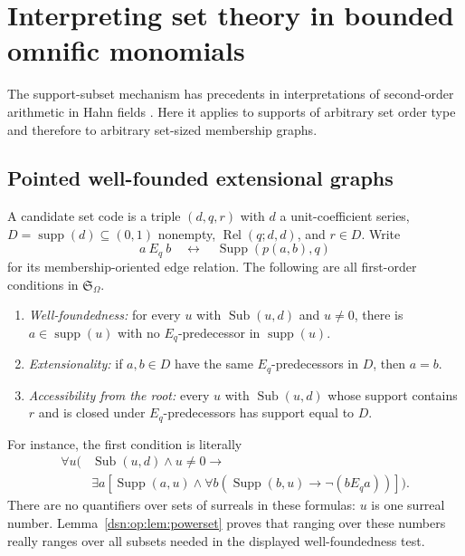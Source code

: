 \documentclass[11pt,a4paper]{article}
\numberwithin{equation}{section}
\theoremstyle{definition}
\theoremstyle{remark}
\newcommand{\Somega}{\mathfrak S_\Omega}
\begin{document}
\section{Interpreting set theory in bounded omnific monomials}
\label{dsn:op:sec:set-interpretation}

The support-subset mechanism has precedents in interpretations of
second-order arithmetic in Hahn fields \cite{Camacho}.  Here it applies
to supports of arbitrary set order type and therefore to arbitrary
set-sized membership graphs.

\subsection{Pointed well-founded extensional graphs}

A candidate set code is a triple $(d,q,r)$ with $d$ a unit-coefficient
series, $D=\operatorname{supp}(d)\subseteq(0,1)$ nonempty,
$\operatorname{Rel}(q;d,d)$, and $r\in D$.  Write
\[
 a\ E_q\ b\quad\longleftrightarrow\quad
                   \operatorname{Supp}(p(a,b),q)
\]
for its membership-oriented edge relation.  The following are all
first-order conditions in $\Somega$.

\begin{enumerate}
\item \emph{Well-foundedness:} for every $u$ with
$\operatorname{Sub}(u,d)$ and $u\ne0$, there is
$a\in\operatorname{supp}(u)$ with no $E_q$-predecessor in
$\operatorname{supp}(u)$.
\item \emph{Extensionality:} if $a,b\in D$ have the same
$E_q$-predecessors in $D$, then $a=b$.
\item \emph{Accessibility from the root:} every $u$ with
$\operatorname{Sub}(u,d)$ whose support contains $r$ and is closed under
$E_q$-predecessors has support equal to $D$.
\end{enumerate}

For instance, the first condition is literally
\[
 \begin{split}
 \forall u\bigl(&\operatorname{Sub}(u,d)\wedge u\ne0
 \longrightarrow\\[-1mm]
 &\exists a[\operatorname{Supp}(a,u)\wedge
  \forall b(\operatorname{Supp}(b,u)\longrightarrow\neg(bE_q a))]
 \bigr).
 \end{split}
\]
There are no quantifiers over sets of surreals in these formulas: $u$ is
one surreal number.  Lemma~\ref{dsn:op:lem:powerset} proves that ranging over
these numbers really ranges over all subsets needed in the displayed
well-foundedness test.
\end{document}
